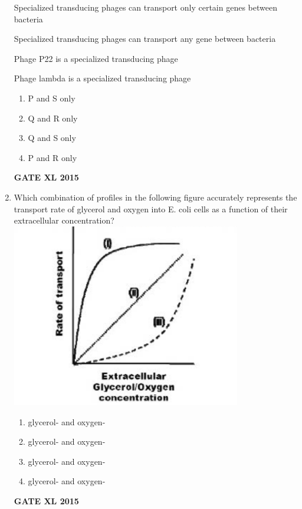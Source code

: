 \documentclass[journal,12pt,onecolumn]{IEEEtran}
\begin{document}
\begin{enumerate}
 Specialized transducing phages can transport only certain genes between bacteria

 Specialized transducing phages can transport any gene between bacteria

 Phage P22 is a specialized transducing phage

 Phage lambda  is a specialized transducing phage
    \begin{enumerate}
            \item P and S only
	    \item Q and R only
	    \item Q and S only
            \item P and R only
    \end{enumerate}
\begin{flushright}\textbf{GATE XL 2015}\end{flushright}
\item Which combination of profiles in the following figure accurately represents the transport rate of glycerol and oxygen into E. coli cells as a function of their extracellular concentration?\\
	\includegraphics[width=10cm]{77}
    \begin{enumerate}
	    \item glycerol- and oxygen-
	    \item glycerol- and oxygen-
	    \item glycerol- and oxygen-
	    \item glycerol- and oxygen-
    \end{enumerate}
\begin{flushright}\textbf{GATE XL 2015}\end{flushright}

\end{enumerate}
\end{document}
